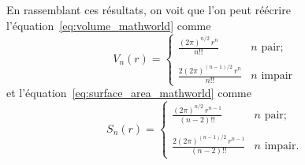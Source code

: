 En rassemblant ces résultats, on voit que l'on peut réécrire
l'équation~\eqref{eq:volume_mathworld} comme
\begin{equation}
\label{eq:volume_2pi}
V_n(r) = \begin{cases}
 \displaystyle \frac{(2\pi)^{n/2}\,r^n}{n!!} & n \text{ pair}; \\ \\
 \displaystyle \frac{2(2\pi)^{(n-1)/2}\,r^n}{n!!} & n \text{ impair}
 \end{cases}
\end{equation}
et l'équation~\eqref{eq:surface_area_mathworld} comme
\begin{equation}
\label{eq:surface_area_2pi}
S_n(r) = \begin{cases}
\displaystyle \frac{(2\pi)^{n/2}\,r^{n-1}}{(n-2)!!} & n \text{ pair}; \\ \\
\displaystyle \frac{2(2\pi)^{(n-1)/2}\,r^{n-1}}{(n-2)!!} & n \text{ impair}.
\end{cases}
\end{equation}

